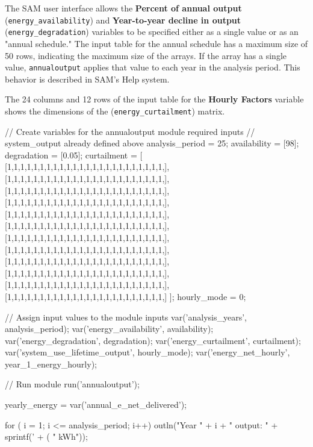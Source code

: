\documentclass{scrartcl} %
\begin{document}
The SAM user interface allows the \textbf{Percent of annual output} (\texttt{energy\_availability}) and \textbf{Year-to-year decline in output} (\texttt{energy\_degradation}) variables to be specified either as a single value or as an "annual schedule." The input table for the annual schedule has a maximum size of 50 rows, indicating the maximum size of the arrays. If the array has a single value, \texttt{annualoutput} applies that value to each year in the analysis period. This behavior is described in SAM's Help system.

The 24 columns and 12 rows of the input table for the \textbf{Hourly Factors} variable shows the dimensions of the (\texttt{energy\_curtailment}) matrix.

\begin{verbatimtab}

// Create variables for the annualoutput module required inputs
// system_output already defined above
analysis_period = 25;
availability = [98];
degradation = [0.05];
curtailment = [ [1,1,1,1,1,1,1,1,1,1,1,1,1,1,1,1,1,1,1,1,1,1,1,1,],
                [1,1,1,1,1,1,1,1,1,1,1,1,1,1,1,1,1,1,1,1,1,1,1,1,],
                [1,1,1,1,1,1,1,1,1,1,1,1,1,1,1,1,1,1,1,1,1,1,1,1,],
                [1,1,1,1,1,1,1,1,1,1,1,1,1,1,1,1,1,1,1,1,1,1,1,1,],
                [1,1,1,1,1,1,1,1,1,1,1,1,1,1,1,1,1,1,1,1,1,1,1,1,],
                [1,1,1,1,1,1,1,1,1,1,1,1,1,1,1,1,1,1,1,1,1,1,1,1,],
                [1,1,1,1,1,1,1,1,1,1,1,1,1,1,1,1,1,1,1,1,1,1,1,1,],
                [1,1,1,1,1,1,1,1,1,1,1,1,1,1,1,1,1,1,1,1,1,1,1,1,],
                [1,1,1,1,1,1,1,1,1,1,1,1,1,1,1,1,1,1,1,1,1,1,1,1,],
                [1,1,1,1,1,1,1,1,1,1,1,1,1,1,1,1,1,1,1,1,1,1,1,1,],
                [1,1,1,1,1,1,1,1,1,1,1,1,1,1,1,1,1,1,1,1,1,1,1,1,],
                [1,1,1,1,1,1,1,1,1,1,1,1,1,1,1,1,1,1,1,1,1,1,1,1,] ];
hourly_mode = 0;

// Assign input values to the module inputs
var('analysis_years', analysis_period);
var('energy_availability', availability);
var('energy_degradation', degradation);
var('energy_curtailment', curtailment);
var('system_use_lifetime_output', hourly_mode);
var('energy_net_hourly', year_1_energy_hourly);

// Run module
run('annualoutput');

yearly_energy = var('annual_e_net_delivered');

for ( i = 1; i <= analysis_period; i++)
{
  outln("Year " + i + " output: " + sprintf('%
                                            + ( " kWh"));
}


\end{verbatimtab}
\end{document}
